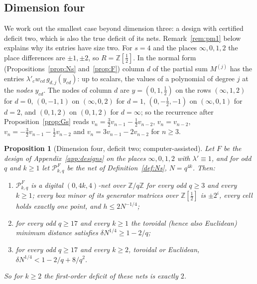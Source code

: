 \documentclass[11pt]{amsart}
\newtheorem{proposition}[theorem]{Proposition}
\theoremstyle{definition}
\theoremstyle{plain}
\newcommand{\Z}{\mathbb{Z}}
\begin{document}
\subsection{Dimension four}\label{sec:dim4ex}
We work out the smallest case beyond dimension three: a design with certified deficit two, which is also the true deficit of its nets. Remark~\ref{rem:pm1} below explains why its entries have size two. For $s=4$ and the places $\infty,0,1,2$ the place differences are $\pm1,\pm2$, so $R=\Z[\frac12]$. In the normal form (Propositions~\ref{prop:Ns} and~\ref{prop:F}) column $d$ of the partial sum $M^{(j)}$ has the entries $\lambda'_cw_{cd}\,g_{d,j}(y_{cd})$: up to scalars, the values of a polynomial of degree $j$ at the \emph{nodes} $y_{cd}$. The nodes of column $d$ are $y=(0,1,\frac12)$ on the rows $(\infty,1,2)$ for $d=0$, $(0,-1,1)$ on $(\infty,0,2)$ for $d=1$, $(0,-\frac12,-1)$ on $(\infty,0,1)$ for $d=2$, and $(0,1,2)$ on $(0,1,2)$ for $d=\infty$; so the recurrence after Proposition~\ref{prop:Gs} reads $v_n=\frac32v_{n-1}-\frac12v_{n-2}$, $v_n=v_{n-2}$, $v_n=-\frac32v_{n-1}-\frac12v_{n-2}$ and $v_n=3v_{n-1}-2v_{n-2}$ for $n\ge3$.

\begin{proposition}[Dimension four, deficit two; computer-assisted]\label{prop:4D2}
Let $F$ be the design of Appendix~\ref{app:designs} on the places $\infty,0,1,2$ with $\lambda'\equiv1$, and for odd $q$ and $k\ge1$ let $\mathcal P^F_{k,q}$ be the net of Definition~\ref{def:Ns}, $N=q^{4k}$. Then:
\begin{enumerate}
\item $\mathcal P^F_{k,q}$ is a digital $(0,4k,4)$-net over $\Z/q\Z$ for every odd $q\ge3$ and every $k\ge1$; every box minor of its generator matrices over $\Z[\frac12]$ is $\pm2^i$, every cell holds exactly one point, and $h\le2N^{-1/4}$;
\item for every odd $q\ge17$ and every $k\ge1$ the toroidal (hence also Euclidean) minimum distance satisfies $\delta N^{1/4}\ge1-2/q$;
\item for every odd $q\ge17$ and every $k\ge2$, toroidal or Euclidean, $\delta N^{1/4}<1-2/q+8/q^2$.
\end{enumerate}
So for $k\ge2$ the first-order deficit of these nets is exactly $2$.
\end{proposition}
\end{document}
